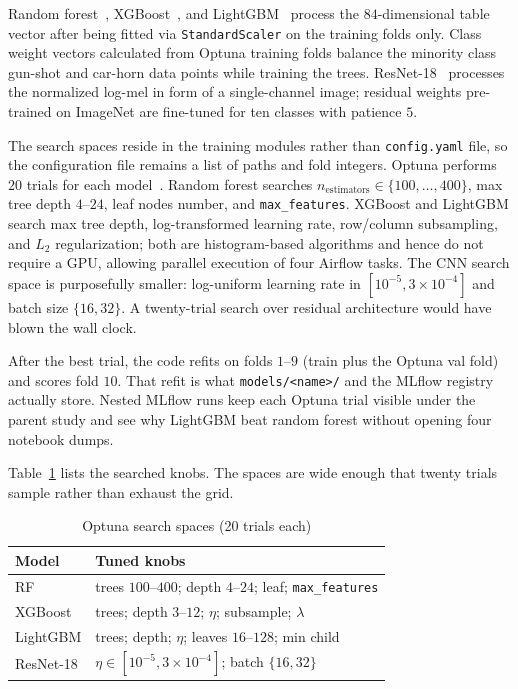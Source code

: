 \documentclass[conference]{IEEEtran}
\begin{document}
Random forest~\cite{breiman2001rf}, XGBoost~\cite{chen2016xgboost}, and LightGBM~\cite{ke2017lightgbm} process the \(84\)-dimensional table vector after being fitted via \texttt{StandardScaler} on the training folds only.
Class weight vectors calculated from Optuna training folds balance the minority class gun-shot and car-horn data points while training the trees.
ResNet-18~\cite{he2016resnet} processes the normalized log-mel in form of a single-channel image; residual weights pre-trained on ImageNet are fine-tuned for ten classes with patience \(5\).

The search spaces reside in the training modules rather than \texttt{config.yaml} file, so the configuration file remains a list of paths and fold integers.
Optuna performs \(20\) trials for each model~\cite{akiba2019optuna}.
Random forest searches \(n_{\mathrm{estimators}}\in\{100,\ldots,400\}\), max tree depth \(4\)--\(24\), leaf nodes number, and \texttt{max\_features}.
XGBoost and LightGBM search max tree depth, log-transformed learning rate, row/column subsampling, and \(L_2\) regularization; both are histogram-based algorithms and hence do not require a GPU, allowing parallel execution of four Airflow tasks.
The CNN search space is purposefully smaller: log-uniform learning rate in \([10^{-5}, 3\times 10^{-4}]\) and batch size \(\{16,32\}\).
A twenty-trial search over residual architecture would have blown the wall clock.

After the best trial, the code refits on folds \(1\)--\(9\) (train plus the Optuna val fold) and scores fold \(10\).
That refit is what \texttt{models/<name>/} and the MLflow registry actually store.
Nested MLflow runs keep each Optuna trial visible under the parent study  and see why LightGBM beat random forest without opening four notebook dumps.

Table~\ref{tab:search} lists the searched knobs.
The spaces are wide enough that twenty trials sample rather than exhaust the grid.

\begin{table}[!t]
  \renewcommand{\arraystretch}{1.12}
  \setlength{\tabcolsep}{2.5pt}
  \caption{Optuna search spaces (20 trials each)}
  \label{tab:search}
  \centering
  \begin{tabular}{ll}
    \toprule
    Model & Tuned knobs \\
    \midrule
    RF & trees \(100\)--\(400\); depth \(4\)--\(24\); leaf; \texttt{max\_features} \\
    XGBoost & trees; depth \(3\)--\(12\); \(\eta\); subsample; \(\lambda\) \\
    LightGBM & trees; depth; \(\eta\); leaves \(16\)--\(128\); min child \\
    ResNet-18 & \(\eta\in[10^{-5},3\times10^{-4}]\); batch \(\{16,32\}\) \\
    \bottomrule
  \end{tabular}
\end{table}
\end{document}
